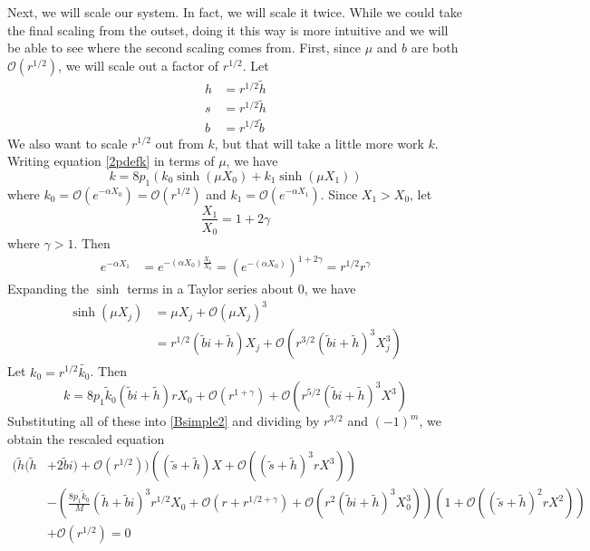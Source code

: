 \documentclass[thesis.tex]{subfiles}
\begin{document}
Next, we will scale our system. In fact, we will scale it twice. While we could take the final scaling from the outset, doing it this way is more intuitive and we will be able to see where the second scaling comes from. First, since $\mu$ and $b$ are both $\mathcal{O}(r^{1/2})$, we will scale out a factor of $r^{1/2}$. Let
\begin{align*}
h &= r^{1/2} \tilde{h} \\
s &= r^{1/2} \tilde{h} \\
b &= r^{1/2} \tilde{b}
\end{align*}
We also want to scale $r^{1/2}$ out from $k$, but that will take a little more work $k$. Writing equation \cref{2pdefk} in terms of $\mu$, we have
\[
k = 8 p_1 ( k_0\sinh(\mu X_0) + k_1 \sinh(\mu X_1) ) 
\]
where $k_0 = \mathcal{O}(e^{-\alpha X_0}) = \mathcal{O}(r^{1/2})$ and $k_1 = \mathcal{O}(e^{-\alpha X_1})$. Since $X_1 > X_0$, let 
\[
\frac{X_1}{X_0} = 1 + 2 \gamma
\]
where $\gamma > 1$. Then
\begin{align*}
e^{-\alpha X_1} &= e^{-(\alpha X_0)\frac{X_1}{X_0}}
= \left( e^{-(\alpha X_0)} \right)^{1 + 2 \gamma} = r^{1/2}r^{\gamma}
\end{align*}
Expanding the $\sinh$ terms in a Taylor series about 0, we have
\begin{align*}
\sinh(\mu X_j) &= \mu X_j + \mathcal{O}(\mu X_j)^3 \\
&= r^{1/2}(\tilde{b}i + \tilde{h})X_j + \mathcal{O}(r^{3/2} (\tilde{b}i + \tilde{h})^3 X_j^3)
\end{align*}
Let $k_0 = r^{1/2} \tilde{k_0}$. Then
\[
k = 8 p_1 \tilde{k}_0 (\tilde{b}i + \tilde{h})r X_0 +  \mathcal{O}(r^{1 + \gamma}) + \mathcal{O}(r^{5/2} (\tilde{b}i + \tilde{h})^3 X^3)
\]
Substituting all of these into \cref{Bsimple2} and dividing by $r^{3/2}$ and $(-1)^m$, we obtain the rescaled equation
\begin{equation}\label{Bsimple4}
\begin{aligned}
( \tilde{h}( \tilde{h} &+ 2 \tilde{b} i) + \mathcal{O}( r^{1/2} ))\left( (\tilde{s} + \tilde{h})X + \mathcal{O}\left( (\tilde{s} + \tilde{h})^3 r X^3 \right) \right) \\ 
&- \left(\frac{8 p_1 \tilde{k}_0}{M} ( \tilde{h} + \tilde{b}i)^3 r^{1/2} X_0 + \mathcal{O}(r + r^{1/2 + \gamma}) + \mathcal{O}(r^{2} (\tilde{b}i + \tilde{h})^3 X_0^3) \right)\left( 1 + \mathcal{O}\left( (\tilde{s} + \tilde{h})^2 r X^2 \right) \right) \\
&+ \mathcal{O}( r^{1/2} ) = 0
\end{aligned}
\end{equation} 
\end{document}

